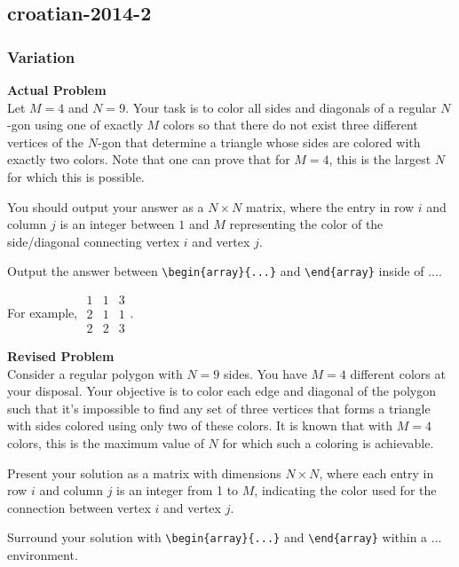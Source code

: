 \subsection{croatian-2014-2}
\subsubsection{Variation}
\textbf{Actual Problem}\\
Let $M = 4$ and $N = 9$. Your task is to color all sides and diagonals of a regular $N$-gon using one of exactly $M$ colors so that there do not exist three different vertices of the $N$-gon
that determine a triangle whose sides are colored with exactly two colors.
Note that one can prove that for $M = 4$, this is the largest $N$ for which this is possible.


You should output your answer as a ${N} \times {N}$ matrix, where the entry in row $i$ and column $j$ is an integer between $1$ and $M$ representing the color of the side/diagonal connecting vertex $i$ and vertex $j$.
 
Output the answer between \verb|\begin{array}{...}| and \verb|\end{array}| inside of $\boxed{...}$. 

For example, $\boxed{\begin{array}{ccc}1 & 1 & 3 \\ 2 & 1 & 1 \\ 2 & 2 & 3\end{array}}$.

\textbf{Revised Problem}\\
Consider a regular polygon with $N = 9$ sides. You have $M = 4$ different colors at your disposal. Your objective is to color each edge and diagonal of the polygon such that it's impossible to find any set of three vertices that forms a triangle with sides colored using only two of these colors. It is known that with $M = 4$ colors, this is the maximum value of $N$ for which such a coloring is achievable.

Present your solution as a matrix with dimensions ${N} \times {N}$, where each entry in row $i$ and column $j$ is an integer from 1 to $M$, indicating the color used for the connection between vertex $i$ and vertex $j$.

Surround your solution with \verb|\begin{array}{...}| and \verb|\end{array}| within a $\boxed{...}$ environment. 

